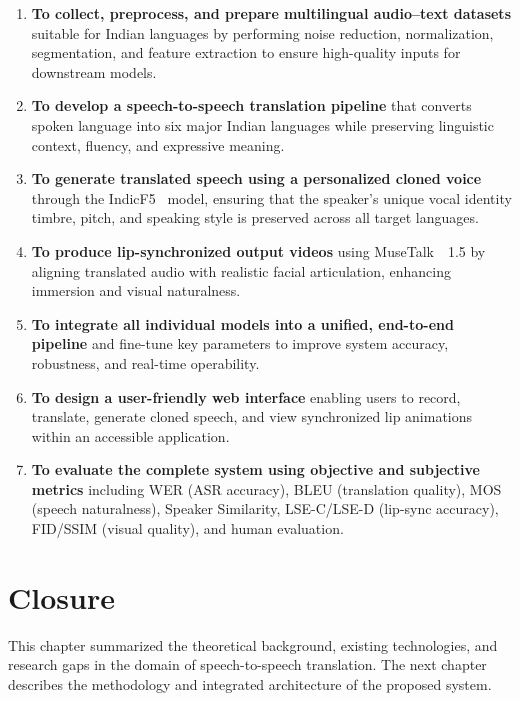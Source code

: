 \documentclass[12pt,oneside]{report}
\begin{document}
\begin{enumerate}
    \item \textbf{To collect, preprocess, and prepare multilingual audio--text datasets} suitable for Indian languages by performing noise reduction, normalization, segmentation, and feature extraction to ensure high-quality inputs for downstream models.

    \item \textbf{To develop a speech-to-speech translation pipeline} that converts spoken language into six major Indian languages while preserving linguistic context, fluency, and expressive meaning.

    \item \textbf{To generate translated speech using a personalized cloned voice} through the IndicF5~\cite{indicf5_2025} model, ensuring that the speaker’s unique vocal identity timbre, pitch, and speaking style is preserved across all target languages.

    \item \textbf{To produce lip-synchronized output videos} using MuseTalk~\cite{zhang2023musetalk}~1.5 by aligning translated audio with realistic facial articulation, enhancing immersion and visual naturalness.

    \item \textbf{To integrate all individual models into a unified, end-to-end pipeline} and fine-tune key parameters to improve system accuracy, robustness, and real-time operability.

    \item \textbf{To design a user-friendly web interface} enabling users to record, translate, generate cloned speech, and view synchronized lip animations within an accessible application.

    \item \textbf{To evaluate the complete system using objective and subjective metrics} including WER (ASR accuracy), BLEU (translation quality), MOS (speech naturalness), Speaker Similarity, LSE-C/LSE-D (lip-sync accuracy), FID/SSIM (visual quality), and human evaluation.
\end{enumerate}


\section{Closure}

This chapter summarized the theoretical background, existing technologies, and research gaps in the domain of speech-to-speech translation. The next chapter describes the methodology and integrated architecture of the proposed system.
\end{document}
